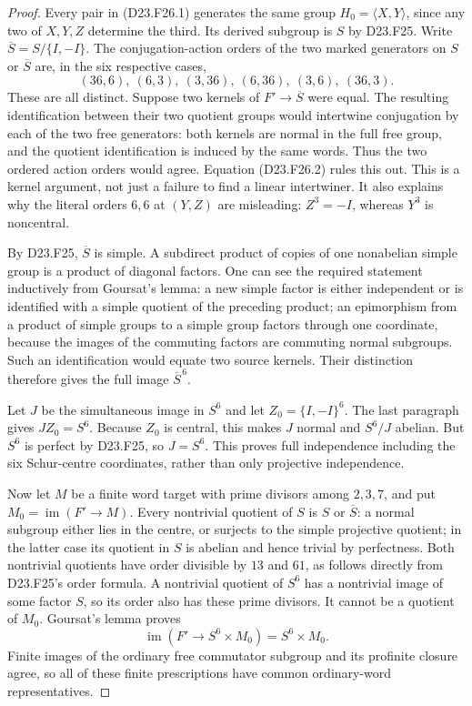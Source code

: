 \begin{proof}
Every pair in (D23.F26.1) generates the same group
$H_0=\langle X,Y\rangle$, since any two of $X,Y,Z$ determine
the third.  Its derived subgroup is $S$ by D23.F25.  Write
$\overline S=S/\{I,-I\}$.  The conjugation-action orders of
the two marked generators on $S$ or $\overline S$ are,
in the six respective cases,
\[
       (36,6),\ (6,3),\ (3,36),\ (6,36),\ (3,6),\ (36,3).
\tag{D23.F26.2}
\]
These are all distinct.  Suppose two kernels of
$F'\to\overline S$ were equal.  The resulting identification
between their two quotient groups would intertwine conjugation
by each of the two free generators: both kernels are normal
in the full free group, and the quotient identification is
induced by the same words.  Thus the two ordered action orders
would agree.  Equation (D23.F26.2) rules this out.  This is a
kernel argument, not just a failure to find a linear intertwiner.
It also explains why the literal orders $6,6$ at $(Y,Z)$ are
misleading: $Z^3=-I$, whereas $Y^3$ is noncentral.

By D23.F25, $\overline S$ is simple.  A subdirect product of
copies of one nonabelian simple group is a product of diagonal
factors.  One can see the required statement inductively from
Goursat's lemma: a new simple factor is either independent or
is identified with a simple quotient of the preceding product;
an epimorphism from a product of simple groups to a simple
group factors through one coordinate, because the images of
the commuting factors are commuting normal subgroups.
Such an identification would equate two source kernels.
Their distinction therefore gives the full image
$\overline S^{\,6}$.

Let $J$ be the simultaneous image in $S^6$ and let
$Z_0=\{I,-I\}^6$.  The last paragraph gives $JZ_0=S^6$.
Because $Z_0$ is central, this makes $J$ normal and $S^6/J$
abelian.  But $S^6$ is perfect by D23.F25, so $J=S^6$.
This proves full independence including the six Schur-centre
coordinates, rather than only projective independence.

Now let $M$ be a finite word target with prime divisors among
$2,3,7$, and put $M_0=\operatorname{im}(F'\to M)$.
Every nontrivial quotient of $S$ is $S$ or $\overline S$:
a normal subgroup either lies in the centre, or surjects to
the simple projective quotient; in the latter case its quotient
in $S$ is abelian and hence trivial by perfectness.
Both nontrivial quotients have order divisible by $13$ and
$61$, as follows directly from D23.F25's order formula.
A nontrivial quotient of $S^6$ has a nontrivial image of some
factor $S$, so its order also has these prime divisors.
It cannot be a quotient of $M_0$.  Goursat's lemma proves
\[
 \operatorname{im}(F'\longrightarrow S^6\times M_0)
                         =S^6\times M_0.
\tag{D23.F26.3}
\]
Finite images of the ordinary free commutator subgroup and its
profinite closure agree, so all of these finite prescriptions
have common ordinary-word representatives.


\end{proof}
